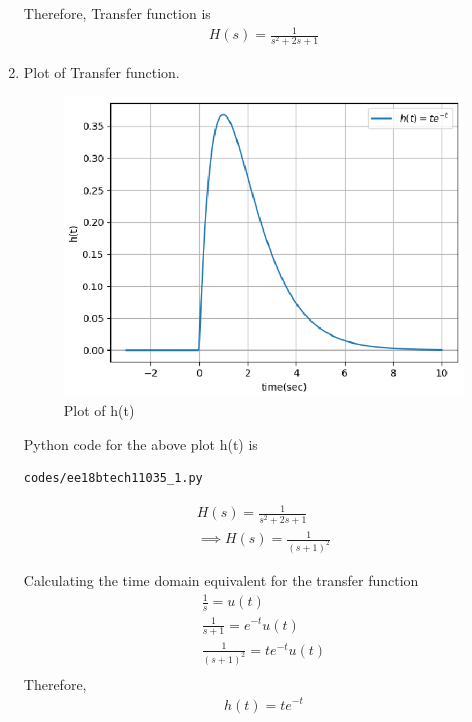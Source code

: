 \begin{enumerate}[label=\thesection.\arabic*.,ref=\thesection.\theenumi]
Therefore, Transfer function is 
\begin{align}
H(s) = \frac{1}{s^2+2s+1}
\end{align}

\item Plot of Transfer function.
\\ \solution  
\begin{figure}[!h]
\includegraphics[width=\columnwidth]{./figures/ee18btech11035_2.eps}
\caption{Plot of h(t)}
\label{fig:ee18btech11035_h(t)}
\end{figure}

Python code for the above plot h(t) is
\begin{lstlisting}
codes/ee18btech11035_1.py
\end{lstlisting}

\begin{align}
H(s) = \frac{1}{s^2+2s+1}\\
\implies H(s) = \frac{1}{(s+1)^2}
\end{align}

Calculating the time domain equivalent for the transfer function\\
\begin{align}
\label{eq:s}
\frac{1}{s} = u(t)\\
\label{eq:s+1}
\frac{1}{s+1} = e^{-t}u(t)\\
\label{eq:(s+1)^2}
\frac{1}{(s+1)^2} = te^{-t}u(t)\\
\end{align}
Therefore,
\begin{align}
h(t) = te^{-t}
\end{align}



\end{enumerate}
